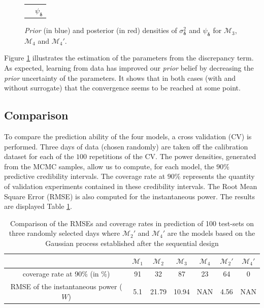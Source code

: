 \documentclass[soumission]{jsfds}
\begin{document}
\begin{figure}[htbp!]
\begin{center}
\begin{tabular}{cccc}
	&\multicolumn{3}{c}{$\psi_{\boldsymbol{\delta}}$}\\
  \end{tabular}   
\caption{\textit{Prior} (in blue) and posterior (in red) densities of $\sigma_{\boldsymbol{\delta}}^2$ and $\psi_{\boldsymbol{\delta}}$ for $\mathcal{M}_3$, $\mathcal{M}_4$ and $\mathcal{M}_4'$.}
\label{fig:comparisionDensities2}
\end{center}
\end{figure}

Figure \ref{fig:comparisionDensities2} illustrates the estimation of the parameters from the discrepancy term.
As expected, learning from data has improved our \textit{prior} belief by decreasing the \textit{prior} uncertainty of the parameters. 
It shows that in both cases (with and without surrogate) that the convergence seems to be reached at some point. \newline

\subsection{Comparison}

To compare the prediction ability of the four models,
a cross validation (CV) is performed.
Three days of data (chosen randomly) are taken off the calibration dataset for each of the $100$ repetitions of the CV. 
The power densities, generated from the MCMC samples, allow us to compute, for each model, the $90\%$ predictive credibility intervals. 
The coverage rate at $90\%$ represents the quantity of validation experiments contained in these credibility intervals.
The Root Mean Square Error (RMSE) is also computed for the instantaneous power. The results are displayed Table 
\ref{tab:comparison}.\newline

\begin{table}[htbp!]
\centering
\caption{Comparison of the RMSEs and coverage rates in prediction of 100 test-sets on three randomly selected days where $\mathcal{M}_2'$ and $\mathcal{M}_4'$ are the models based on the Gaussian process established after the sequential design}
\label{tab:comparison}
\begin{tabular}{c|c|c|c|c|c|c}

& $\mathcal{M}_1$ & $\mathcal{M}_2$ & $\mathcal{M}_3$ & $\mathcal{M}_4$ & $\mathcal{M}_2'$&  $\mathcal{M}_4'$ \\
\hline
\hline
coverage rate at 90\% (in \%) & 91 & 32 & 87 & 23 & 64 & 0 \\
\hline
RMSE of the instantaneous power ($W$) & 5.1 & 21.79 & 10.94 & NAN & 4.56 & NAN \\
\end{tabular}
\end{table}
\end{document}
